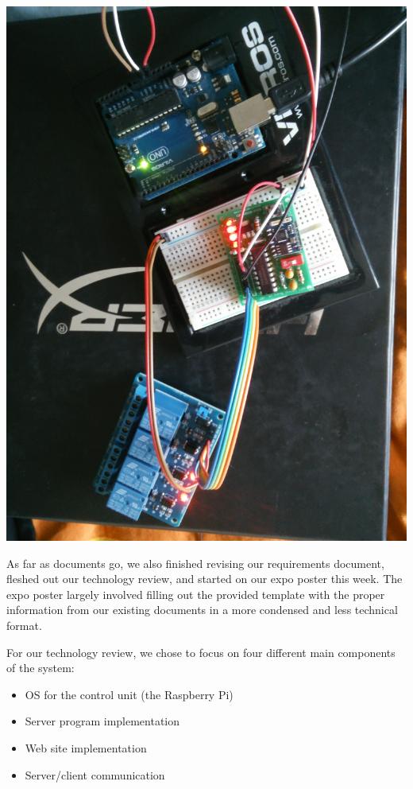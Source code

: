 \documentclass[letterpaper,10pt]{article}
\begin{document}
\includegraphics[scale=0.1]{circuit.jpg}

As far as documents go, we also finished revising our requirements document,
fleshed out our technology review, and started on our expo poster this week.
The expo poster largely involved filling out the provided template with the
proper information from our existing documents in a more condensed and less
technical format.

For our technology review, we chose to focus on four different main components of the system:

\begin{itemize}
    \item OS for the control unit (the Raspberry Pi)
    \item Server program implementation
    \item Web site implementation
    \item Server/client communication
\end{itemize}
\end{document}

